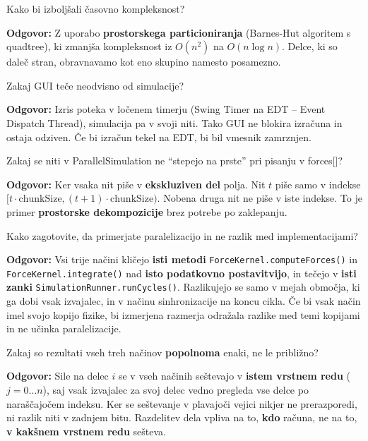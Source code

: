 \documentclass[12pt,a4paper]{article}
\begin{document}
\begin{vprasanje}
Kako bi izbolj\v{s}ali \v{c}asovno kompleksnost?

\textbf{Odgovor:} Z uporabo \textbf{prostorskega particioniranja} (Barnes-Hut algoritem s quadtree), ki zmanj\v{s}a kompleksnost iz $O(n^2)$ na $O(n \log n)$. Delce, ki so dale\v{c} stran, obravnavamo kot eno skupino namesto posamezno.
\end{vprasanje}

\begin{vprasanje}
Zakaj GUI te\v{c}e neodvisno od simulacije?

\textbf{Odgovor:} Izris poteka v lo\v{c}enem timerju (Swing Timer na EDT -- Event Dispatch Thread), simulacija pa v svoji niti. Tako GUI ne blokira izra\v{c}una in ostaja odziven. \v{C}e bi izra\v{c}un tekel na EDT, bi bil vmesnik zamrznjen.
\end{vprasanje}

\begin{vprasanje}
Zakaj se niti v ParallelSimulation ne ``stepejo na prste'' pri pisanju v forces[]?

\textbf{Odgovor:} Ker vsaka nit pi\v{s}e v \textbf{ekskluziven del} polja. Nit $t$ pi\v{s}e samo v indekse $[t \cdot \text{chunkSize}, (t+1) \cdot \text{chunkSize})$. Nobena druga nit ne pi\v{s}e v iste indekse. To je primer \textbf{prostorske dekompozicije} brez potrebe po zaklepanju.
\end{vprasanje}

\begin{vprasanje}
Kako zagotovite, da primerjate paralelizacijo in ne razlik med implementacijami?

\textbf{Odgovor:} Vsi trije na\v{c}ini kli\v{c}ejo \textbf{isti metodi} \texttt{ForceKernel.computeForces()} in \texttt{ForceKernel.integrate()} nad \textbf{isto podatkovno postavitvijo}, in te\v{c}ejo v \textbf{isti zanki} \texttt{SimulationRunner.runCycles()}. Razlikujejo se samo v mejah obmo\v{c}ja, ki ga dobi vsak izvajalec, in v na\v{c}inu sinhronizacije na koncu cikla. \v{C}e bi vsak na\v{c}in imel svojo kopijo fizike, bi izmerjena razmerja odra\v{z}ala razlike med temi kopijami in ne u\v{c}inka paralelizacije.
\end{vprasanje}

\begin{vprasanje}
Zakaj so rezultati vseh treh na\v{c}inov \textbf{popolnoma} enaki, ne le pribli\v{z}no?

\textbf{Odgovor:} Sile na delec $i$ se v vseh na\v{c}inih se\v{s}tevajo v \textbf{istem vrstnem redu} ($j = 0 \ldots n$), saj vsak izvajalec za svoj delec vedno pregleda vse delce po nara\v{s}\v{c}ajo\v{c}em indeksu. Ker se se\v{s}tevanje v plavajo\v{c}i vejici nikjer ne prerazporedi, ni razlik niti v zadnjem bitu. Razdelitev dela vpliva na to, \textbf{kdo} ra\v{c}una, ne na to, \textbf{v kak\v{s}nem vrstnem redu} se\v{s}teva.
\end{vprasanje}
\end{document}

